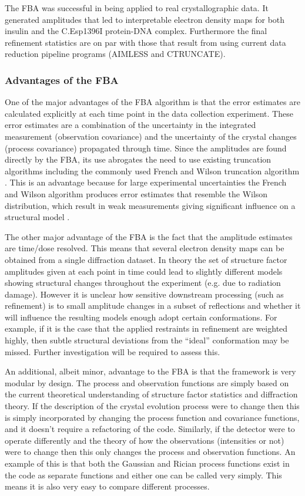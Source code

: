 The FBA was successful in being applied to real crystallographic data.
It generated amplitudes that led to interpretable electron density maps for both insulin and the C.Esp1396I protein-DNA complex.
Furthermore the final refinement statistics are on par with those that result from using current data reduction pipeline programs (AIMLESS and CTRUNCATE).

\subsubsection{Advantages of the FBA}
\label{subs:Advantages of the FBA}
One of the major advantages of the FBA algorithm is that the error estimates are calculated explicitly at each time point in the data collection experiment.
These error estimates are a combination of the uncertainty in the integrated measurement (observation covariance) and the uncertainty of the crystal changes (process covariance) propagated through time.
Since the amplitudes are found directly by the FBA, its use abrogates the need to use existing truncation algorithms including the commonly used French and Wilson truncation algorithm \cite{french1978treatment}.
This is an advantage because for large experimental uncertainties the French and Wilson algorithm produces error estimates that resemble the Wilson distribution, which result in weak measurements giving significant influence on a structural model \cite{read2015log}.

The other major advantage of the FBA is the fact that the amplitude estimates are time/dose resolved.
This means that several electron density maps can be obtained from a single diffraction dataset.
In theory the set of structure factor amplitudes given at each point in time could lead to slightly different models showing structural changes throughout the experiment (e.g. due to radiation damage).
However it is unclear how sensitive downstream processing (such as refinement) is to small amplitude changes in a subset of reflections and whether it will influence the resulting models enough adopt certain conformations.
For example, if it is the case that the applied restraints in refinement are weighted highly, then subtle structural deviations from the ``ideal'' conformation may be missed.
Further investigation will be required to assess this.

An additional, albeit minor, advantage to the FBA is that the framework is very modular by design.
The process and observation functions are simply based on the current theoretical understanding of structure factor statistics and diffraction theory.
If the description of the crystal evolution process were to change then this is simply incorporated by changing the process function and covariance functions, and it doesn't require a refactoring of the code.
Similarly, if the detector were to operate differently and the theory of how the observations (intensities or not) were to change then this only changes the process and observation functions.
An example of this is that both the Gaussian and Rician process functions exist in the code as separate functions and either one can be called very simply.
This means it is also very easy to compare different processes.

